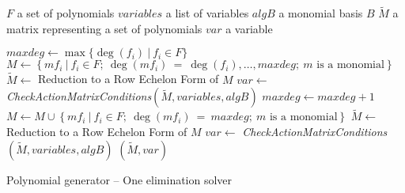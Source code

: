 \begin{algorithm}[ht]
  \begin{algorithmic}[1]
    \Require
      \Statex $F$ a set of polynomials
      \Statex $variables$ a list of variables
      \Statex $algB$ a monomial basis $B$
    \Ensure
      \Statex $\tilde{M}$ a matrix representing a set of polynomials
      \Statex $var$ a variable
      \Statex

    \State $maxdeg \gets \max\{\deg(f_i)\ |\ f_i \in F\}$
    \State $M \gets \left\{m f_i\ |\ f_i \in F;\ \deg(m f_i)\ =\ \deg(f_i),\dots,maxdeg;\ m \textrm{ is a monomial} \right\}$
    \State $\tilde{M} \gets$ Reduction to a Row Echelon Form of $M$
    \State $var \gets$ \textit{CheckActionMatrixConditions}$(\tilde{M}, variables, algB)$
      \State $maxdeg \gets maxdeg + 1$
      \State $M \gets M \cup \left\{m f_i\ |\ f_i \in F;\ \deg(m f_i)\ = \ maxdeg;\ m \textrm{ is a monomial}\right\}$
      \State $\tilde{M} \gets$ Reduction to a Row Echelon Form of $M$
      \State $var \gets$ \textit{CheckActionMatrixConditions}$(\tilde{M}, variables, algB)$
    \EndWhile
    \State \Return $(\tilde{M}, var)$
  \end{algorithmic}
  \caption{Polynomial generator -- One elimination solver}
  \label{alg:oneElGen}
\end{algorithm}

